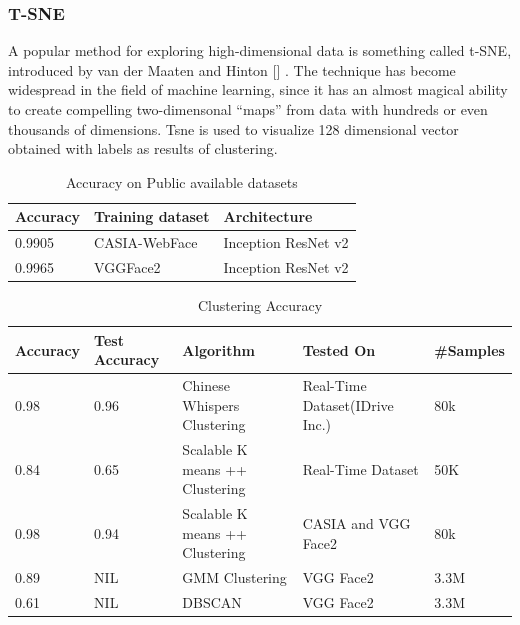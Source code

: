\documentclass[a4paper,12pt, twoside]{NITKReport}
\begin{document}
\subsubsection{T-SNE}
A popular method for exploring high-dimensional data is something called t-SNE, introduced by van der Maaten and Hinton [\cite{maaten2008visualizing}] . The technique has become widespread in the field of machine learning, since it has an almost magical ability to create compelling two-dimensonal “maps” from data with hundreds or even thousands of dimensions. Tsne is used to visualize 128 dimensional vector obtained with labels as results of clustering.

\begin{table}[h]
  \centering
\begin{tabular}{ |p{4cm}|p{4cm}|p{4cm}|}
\hline
Accuracy & Training dataset & Architecture\\
\hline
0.9905 & CASIA-WebFace & Inception ResNet v2 \\
\hline
0.9965 & VGGFace2 &	Inception ResNet v2 \\
\hline
\end{tabular}
\caption{Accuracy on Public available datasets}\label{table:acc_}
\end{table}


\begin{table}[h]
  \centering
\begin{tabular}{ |p{1.5cm}|p{1.5cm}|p{3.5cm}|p{4cm}|p{2cm}|}
\hline
Accuracy & Test Accuracy & Algorithm & Tested On & \#Samples\\
\hline
0.98 & 0.96 & Chinese Whispers Clustering & Real-Time Dataset(IDrive Inc.) & 80k \\
\hline
0.84 & 0.65 & Scalable K means ++ Clustering & Real-Time Dataset & 50K \\
\hline
0.98 & 0.94 & Scalable K means ++ Clustering & CASIA and VGG Face2 & 80k \\
\hline
0.89 & NIL & GMM Clustering & VGG Face2 & 3.3M \\
\hline
0.61 & NIL & DBSCAN & VGG Face2 & 3.3M \\
\hline
\end{tabular}
\caption{Clustering Accuracy}\label{table:cluster}
\end{table}
\end{document}
